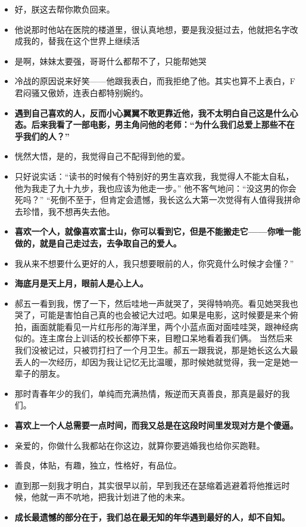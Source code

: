 \documentclass[UTF8,a4paper,8pt]{ctexbook}
\begin{document}
\begin{itemize}
			\item 好，朕这去帮你欺负回来。
			\item 他说那时他站在医院的楼道里，很认真地想，要是我没挺过去，他就把名字改成我的，替我在这个世界上继续活
			\item 是啊，妹妹太要强，哥哥什么都帮不了，只能帮她哭
			\item 冷战的原因说来好笑——他跟我表白，而我拒绝了他。其实也算不上表白，F君闷骚又傲娇，连表白都特别婉约。
			\item \textbf{遇到自己喜欢的人，反而小心翼翼不敢更靠近他，我不太明白自己这是什么心态。后来我看了一部电影，男主角问他的老师：“为什么我们总爱上那些不在乎我们的人？”}
			\item 恍然大悟，是的，我觉得自己不配得到他的爱。
			\item 只好说实话：“读书的时候有个特别好的男生喜欢我，我觉得人不能太自私，他为我走了九十九步，我也应该为他走一步。” 他不客气地问：“没这男的你会死吗？” “死倒不至于，但肯定会遗憾，我长这么大第一次觉得有人值得我拼命去珍惜，我不想再失去他。
			\item \textbf{喜欢一个人，就像喜欢富士山，你可以看到它，但是不能搬走它——你唯一能做的，就是自己走过去，去争取自己的爱人。}
			\item 我从来不想要什么更好的人，我只想要眼前的人，你究竟什么时候才会懂？”
			\item \textbf{海底月是天上月，眼前人是心上人。}
			\item 郝五一看到我，愣了一下，然后哇地一声就哭了，哭得特响亮。看见她哭我也哭了，可能是害怕自己真的也会被记大过吧。如果是电影，这时候要是来个俯拍，画面就能看见一片红彤彤的海洋里，两个小蓝点面对面哇哇哭，跟神经病似的。连主席台上训话的校长都停下来，目瞪口呆地看着我们俩。 当然后来我们没被记过，只被罚打扫了一个月卫生。郝五一跟我说，那是她长这么大最丢人的一次经历，却因为我让记忆无比温暖，那时候她就觉得，我一定是她一辈子的朋友。
			\item 那时青春年少的我们，单纯而充满热情，叛逆而天真善良，那真是最好的我们。
			\item \textbf{喜欢上一个人总需要一点时间，而我又总是在这段时间里发现对方是个傻逼。}
			\item 亲爱的，你做什么我都站在你这边，就算你要逃婚我也给你买跑鞋。
			\item 善良，体贴，有趣，独立，性格好，有品位。
			\item 直到那一刻我才明白，其实很早以前，早到我还在瑟缩着逃避着将他推远时候，他就一声不吭地，把我计划进了他的未来。
			\item \textbf{成长最遗憾的部分在于，我们总在最无知的年华遇到最好的人，却不自知。}

\end{itemize}
\end{document}
